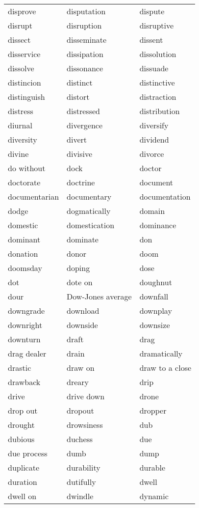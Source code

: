 \documentclass{minimal}
\begin{document}
\begin{longtable}{p{2.8cm}p{2.8cm}p{2.8cm}}
disprove & disputation & dispute \\
disrupt & disruption & disruptive \\
dissect & disseminate & dissent \\
disservice & dissipation & dissolution \\
dissolve & dissonance & dissuade \\
distincion & distinct & distinctive \\
distinguish & distort & distraction \\
distress & distressed & distribution \\
diurnal & divergence & diversify \\
diversity & divert & dividend \\
divine & divisive & divorce \\
do without & dock & doctor \\
doctorate & doctrine & document \\
documentarian & documentary & documentation \\
dodge & dogmatically & domain \\
domestic & domestication & dominance \\
dominant & dominate & don \\
donation & donor & doom \\
doomsday & doping & dose \\
dot & dote on & doughnut \\
dour & Dow-Jones average & downfall \\
downgrade & download & downplay \\
downright & downside & downsize \\
downturn & draft & drag \\
drag dealer & drain & dramatically \\
drastic & draw on & draw to a close \\
drawback & dreary & drip \\
drive & drive down & drone \\
drop out & dropout & dropper \\
drought & drowsiness & dub \\
dubious & duchess & due \\
due process & dumb & dump \\
duplicate & durability & durable \\
duration & dutifully & dwell \\
dwell on & dwindle & dynamic
\end{longtable}
\end{document}
